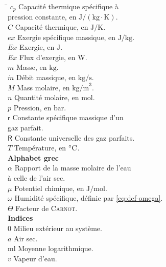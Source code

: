 \documentclass[a4paper,11pt]{scrartcl}
\begin{document}
\begin{multicols}{2}
	\begin{tabbing}
		\hspace{0.05\textwidth} \= \hspace{0.45\textwidth} \kill
		$c_p$ \> Capacité thermique spécifique à \\
		\> pression constante, en $\mathrm{J/(kg \cdot K)}$. \\
		$C$ \> Capacité thermique, en $\mathrm{J/K}$. \\
		$ex$ \> Exergie spécifique massique, en $\mathrm{J/kg}$. \\
		$Ex$ \> Exergie, en $\mathrm{J}$. \\
		$\dot{E}x$ \> Flux d'exergie, en $\mathrm{W}$. \\
		$m$ \> Masse, en $\mathrm{kg}$. \\
		$\dot{m}$ \> Débit massique, en $\mathrm{kg/s}$. \\
		$M$ \> Mass molaire, en $\mathrm{kg/m}^3$. \\
		$n$ \> Quantité molaire, en $\mathrm{mol}$. \\
		$p$ \> Pression, en $\mathrm{bar}$. \\
		$\mathsf{r}$ \> Constante spécifique massique d'un \\
		\> gaz parfait. \\
		$\mathsf{R}$ \> Constante universelle des gaz parfaits. \\
		$T$ \> Température, en $\degree\mathrm{C}$. \\
		\> \textbf{Alphabet grec} \\
		$\alpha$ \> Rapport de la masse molaire de l'eau \\
		\> à celle de l'air sec. \\
		$\mu$ \> Potentiel chimique, en $\mathrm{J/mol}$. \\
		$\omega$ \> Humidité spécifique, définie par
		\eqref{eq:def-omega}. \\
		$\Theta$ \> Facteur de \textsc{Carnot}. \\
		\> \textbf{Indices} \\
		$0$ \> Milieu extérieur au système. \\
		$a$ \> Air sec. \\
		ml \> Moyenne logarithmique. \\
		$v$ \> Vapeur d'eau. \\
	\end{tabbing}
\end{multicols}

\printbibliography
\end{document}
